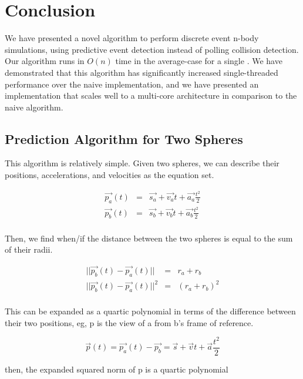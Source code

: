\documentclass[CEJCS,PDF]{cej} %
\begin{document}
\section{Conclusion} 

We have presented a novel algorithm to perform discrete event n-body simulations, using predictive event detection instead of polling collision detection.  Our algorithm runs in $O(n)$ time in the average-case for a single .  We have demonstrated that this algorithm has significantly increased single-threaded performance over the naive implementation, and we have presented an implementation that scales well to a multi-core architecture in comparison to the naive algorithm.




\appendix %
\subsection{Prediction Algorithm for Two Spheres}
\label{predict}
This algorithm is relatively simple.  Given two spheres, we can describe their positions, accelerations, and velocities as the equation set.

\begin{eqnarray*}
\vec{p_a}(t)&=&\vec{s_a}+\vec{v_a} t+\vec{a_a} \frac{t ^ 2}{2} \\
\vec{p_b}(t)&=&\vec{s_b}+\vec{v_b} t+\vec{a_b} \frac{t ^ 2}{2} \\
\end{eqnarray*}

Then, we find when/if the distance between the two spheres is equal to the sum of their radii.  

\begin{eqnarray*}
|| \vec{p_b}(t)-\vec{p_a}(t) ||&=&r_a+r_b \\
|| \vec{p_b}(t)-\vec{p_a}(t) || ^ 2&=&(r_a+r_b) ^ 2 \\
\end{eqnarray*}

This can be expanded as a quartic polynomial in terms of the difference between their two positions, eg, p is the view of a from b's frame of reference.
  
\begin{equation}
\vec{p}(t)=\vec{p_a}(t)-\vec{p_b}=\vec{s}+\vec{v} t+\vec{a} \frac{t ^ 2}{2}
\end{equation}

then, the expanded squared norm of p is a quartic polynomial
\end{document}
